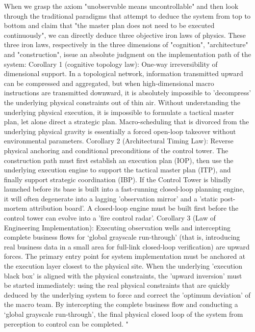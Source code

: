\documentclass[11pt,a4paper]{article}
\begin{document}
When we grasp the axiom "unobservable means uncontrollable" and then look through the traditional paradigms that attempt to deduce the system from top to bottom and claim that "the master plan does not need to be executed continuously", we can directly deduce three objective iron laws of physics. These three iron laws, respectively in the three dimensions of "cognition", "architecture" and "construction", issue an absolute judgment on the implementation path of the system: Corollary 1 (cognitive topology law): One-way irreversibility of dimensional support. In a topological network, information transmitted upward can be compressed and aggregated, but when high-dimensional macro instructions are transmitted downward, it is absolutely impossible to 'decompress' the underlying physical constraints out of thin air. Without understanding the underlying physical execution, it is impossible to formulate a tactical master plan, let alone direct a strategic plan. Macro-scheduling that is divorced from the underlying physical gravity is essentially a forced open-loop takeover without environmental parameters. Corollary 2 (Architectural Timing Law): Reverse physical anchoring and conditional preconditions of the control tower. The construction path must first establish an execution plan (IOP), then use the underlying execution engine to support the tactical master plan (ITP), and finally support strategic coordination (IBP). If the Control Tower is blindly launched before its base is built into a fast-running closed-loop planning engine, it will often degenerate into a lagging 'observation mirror' and a 'static post-mortem attribution board'. A closed-loop engine must be built first before the control tower can evolve into a 'fire control radar'. Corollary 3 (Law of Engineering Implementation): Executing observation wells and intercepting complete business flows for ‘global grayscale run-through’ (that is, introducing real business data in a small area for full-link closed-loop verification) are upward forces. The primary entry point for system implementation must be anchored at the execution layer closest to the physical site. When the underlying 'execution black box' is aligned with the physical constraints, the 'upward inversion' must be started immediately: using the real physical constraints that are quickly deduced by the underlying system to force and correct the 'optimum deviation' of the macro team. By intercepting the complete business flow and conducting a ‘global grayscale run-through’, the final physical closed loop of the system from perception to control can be completed. "
\end{document}
